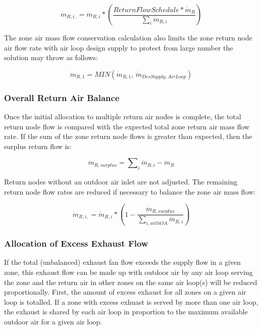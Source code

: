 \begin{equation}
{\dot m_{R,i,}} = {\dot m_{R,i}} * \left(\frac{ReturnFlowSchedule*{\dot m_{R}}} {\sum\nolimits_{i} {{{\dot m}_{R,i}}}} \right) 
\end{equation}

The zone air mass flow conservation calculation also limits the zone return node air flow rate with air loop design supply to protect from large number the solution may throw as follows:

\begin{equation}
{\dot m_{R,1}} = MIN\left( {{\dot m_{R,1}},\,{{\dot m}_{DesSupply, AirLoop}}} \right) 
\end{equation}
 

\subsubsection{Overall Return Air Balance}\label{overall-return-air-balance}

Once the initial allocation to multiple return air nodes is complete, the total return node flow is compared with the expected total zone return air mass flow rate. If the sum of the zone return node flows is greater than expected, then the surplus return flow is:

\begin{equation}
{\dot m_{R,surplus}} = \sum\nolimits_i {{{\dot m}_{R,i}}} - {\dot m_{R}}
\end{equation}

Return nodes without an outdoor air inlet are not adjusted. The remaining return node flow rates are reduced if necessary to balance the zone air mass flow:

\begin{equation}
{\dot m_{R,i,}} = {\dot m_{R,i}} * \left( 1 - \frac{\dot m_{R,surplus}} {\sum\nolimits_{i,withOA} {{{\dot m}_{R,i}}}} \right) 
\end{equation}

\subsubsection{Allocation of Excess Exhaust Flow}\label{allocation-of-excess-exhaust-flow}

If the total (unbalanced) exhaust fan flow exceeds the supply flow in a given zone, this exhaust flow can be made up with outdoor air by any air loop serving the zone and the return air in other zones on the same air loop(s) will be reduced proportionally. First, the amount of excess exhaust for all zones on a given air loop is totalled.  If a zone with excess exhuast is served by more than one air loop, the exhaust is shared by each air loop in proportion to the maximum available outdoor air for a given air loop.

